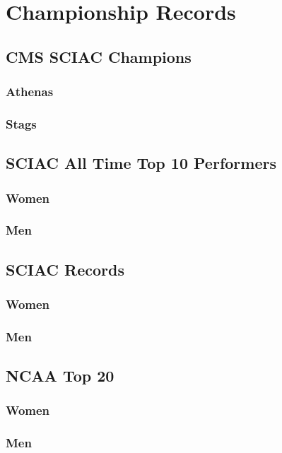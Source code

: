 \section{Championship Records}

\subsection{CMS SCIAC Champions}
\subsubsection{Athenas}
\subsubsection{Stags}

\subsection{SCIAC All Time Top 10 Performers}
\subsubsection{Women}
\subsubsection{Men}

\subsection{SCIAC Records}
\subsubsection{Women}
\subsubsection{Men}

\subsection{NCAA Top 20}
\subsubsection{Women}
\subsubsection{Men}